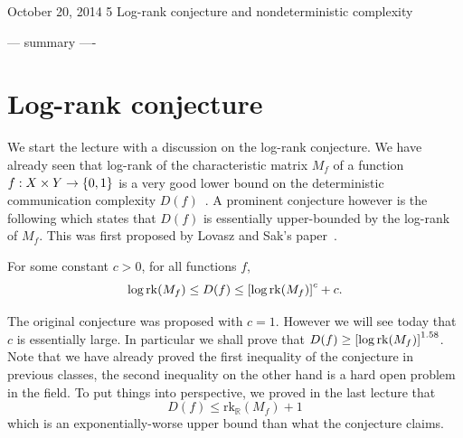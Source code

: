 \documentclass[usletter]{article}
\newcommand{\reals}{\mathbb{R}}
\providecommand\sqbrac[1]{\ensuremath \left[#1\right]}
\providecommand\cbrac[1]{\ensuremath \left\{#1\right\}}
\newcommand{\X}{X}
\newcommand{\Y}{Y}
\newcommand{\rk}{\mathrm{rk}}
\newcommand{\mf}{M_f}
\newcommand{\df}{D(f)}
\begin{document}
           {October 20, 2014}               %
           {5}                              %
           {Log-rank conjecture and nondeterministic complexity}   %

\noindent
--- summary ----


\section{Log-rank conjecture}
\label{sec:log_rank}

We start the lecture with a discussion on the log-rank conjecture. We have already seen that log-rank of the characteristic matrix $\mf$ of a function $f : \X \times \Y \to \cbrac{0,1}$ is a very good lower bound on the deterministic communication complexity $\df$~\cite{mehlhorn1982vegas}. A prominent conjecture however is the following which states that $\df$ is essentially upper-bounded by the log-rank of $\mf$. This was first proposed by Lovasz and Sak's paper~\cite{lovasz1988lattices}.

\begin{conjecture}
\label{conj:log_rank}
For some constant $c > 0$, for all functions $f$,
$$
\log \rk (\mf) \leq \df \leq \sqbrac{\log \rk (\mf)}^c + c.
$$
\end{conjecture}
\begin{remark}
The original conjecture was proposed with $c=1$. However we will see today that $c$ is essentially large. In particular we shall prove that $\df \geq \sqbrac{\log \rk (\mf)}^{1.58}$.
Note that we have already proved the first inequality of the conjecture in previous classes, the second inequality on the other hand is a hard open problem in the field. To put things into perspective, we proved in the last lecture that
$$
\df \leq \rk_\reals (\mf) + 1
$$
which is an exponentially-worse upper bound than what the conjecture claims.
\end{remark}
\end{document}
